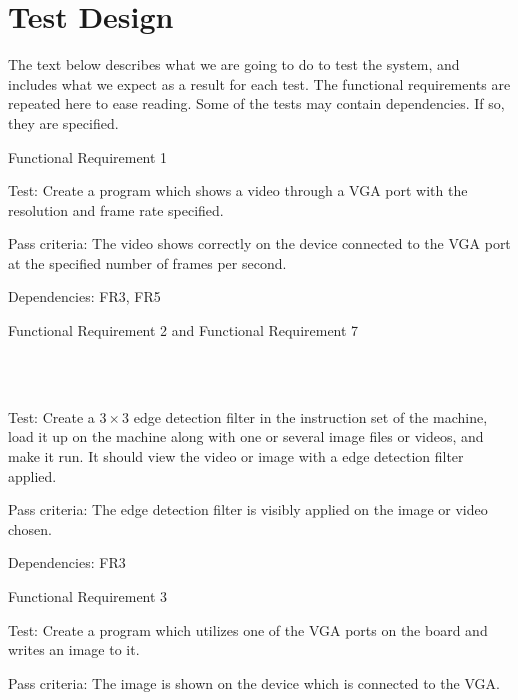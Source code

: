 \section{Test Design}

The text below describes what we are going to do to test the system, and
includes what we expect as a result for each test. The functional requirements
are repeated here to ease reading. Some of the tests may contain
dependencies\footnotemark. If so, they are specified.


{\sc Functional Requirement 1}
\begin{Test}
  {\em \FRI}

  {\sc Test:} Create a program which shows a video through a \ac{VGA} port with
  the resolution and frame rate specified.

  {\sc Pass criteria:} The video shows correctly on the device connected to the
  \ac{VGA} port at the specified number of frames per second.
  
  {\sc Dependencies:} FR3, FR5
\end{Test}

{\sc Functional Requirement 2 and Functional Requirement 7}
\begin{Test}
  {\em \FRII}\\\\
  {\em \FRVII}
  
  {\sc Test:} Create a $3\times3$ edge detection filter in the instruction set
  of the machine, load it up on the machine along with one or several image
  files or videos, and make it run. It should view the video or image with a
  edge detection filter applied.

  {\sc Pass criteria:} The edge detection filter is visibly applied on the
  image or video chosen.

  {\sc Dependencies:} FR3
\end{Test}

{\sc Functional Requirement 3}
\begin{Test}
  {\em \FRIII}
  
  {\sc Test:} Create a program which utilizes one of the \ac{VGA} ports on the
  board and writes an image to it.

  {\sc Pass criteria:} The image is shown on the device which is connected to
  the \ac{VGA}.
\end{Test}


